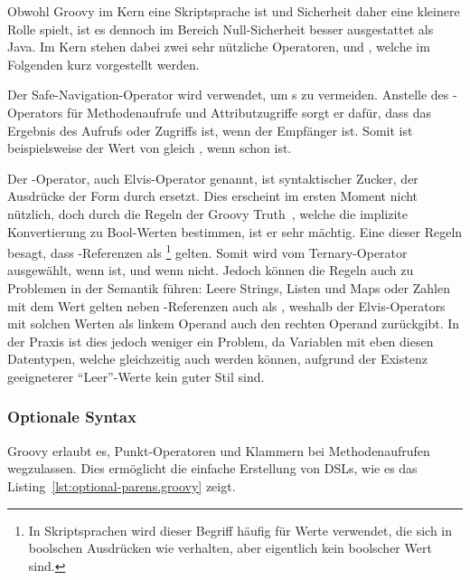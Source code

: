 Obwohl Groovy im Kern eine Skriptsprache ist und Sicherheit daher eine kleinere Rolle spielt, ist es dennoch im Bereich Null-Sicherheit besser ausgestattet als Java.
Im Kern stehen dabei zwei sehr nützliche Operatoren,  und , welche im Folgenden kurz vorgestellt werden.

Der Safe-Navigation-Operator  wird verwendet, um s zu vermeiden.
Anstelle des -Operators für Methodenaufrufe und Attributzugriffe sorgt er dafür, dass das Ergebnis des Aufrufs oder Zugriffs  ist, wenn der Empfänger  ist.
Somit ist beispielsweise der Wert von  gleich , wenn  schon  ist.

Der -Operator, auch Elvis-Operator genannt, ist syntaktischer Zucker, der Ausdrücke der Form  durch  ersetzt.
Dies erscheint im ersten Moment nicht nützlich, doch durch die Regeln der Groovy Truth~\cite[Abs.~5.]{groovy-lang:semantics}, welche die implizite Konvertierung zu Bool-Werten bestimmen, ist er sehr mächtig.
Eine dieser Regeln besagt, dass -Referenzen als \footnote{In Skriptsprachen wird dieser Begriff häufig für Werte verwendet, die sich in boolschen Ausdrücken wie  verhalten, aber eigentlich kein boolscher Wert sind.} gelten.
Somit wird  vom Ternary-Operator ausgewählt, wenn   ist, und  wenn nicht.
Jedoch können die Regeln auch zu Problemen in der Semantik führen:
Leere Strings, Listen und Maps oder Zahlen mit dem Wert  gelten neben -Referenzen auch als , weshalb der Elvis-Operators mit solchen Werten als linkem Operand auch den rechten Operand zurückgibt.
In der Praxis ist dies jedoch weniger ein Problem, da Variablen mit eben diesen Datentypen, welche gleichzeitig auch  werden können, aufgrund der Existenz geeigneterer ``Leer''-Werte kein guter Stil sind.

\subsubsection{Optionale Syntax}\label{subsubsec:optionale-syntax}

Groovy erlaubt es, Punkt-Operatoren und Klammern bei Methodenaufrufen wegzulassen.
Dies ermöglicht die einfache Erstellung von DSLs, wie es das Listing~\ref{lst:optional-parens.groovy} zeigt.


